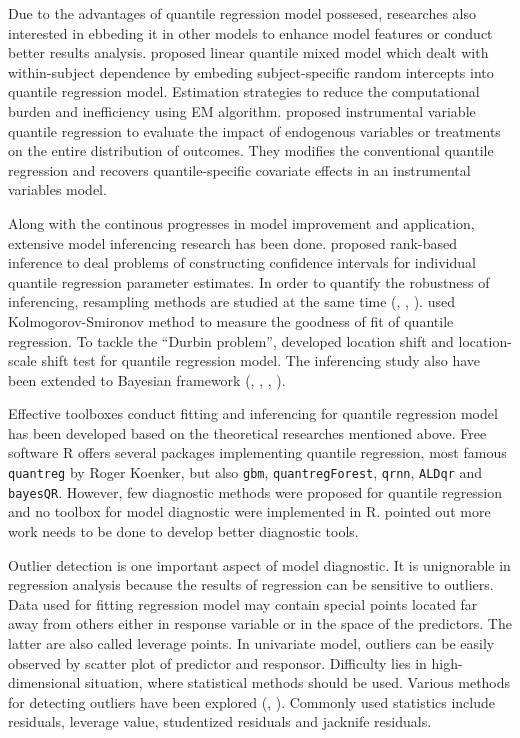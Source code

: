 \documentclass[11pt,a4paper,]{article}
\theoremstyle{definition}
\theoremstyle{definition}
\theoremstyle{remark}
\begin{document}
Due to the advantages of quantile regression model possesed, researches
also interested in ebbeding it in other models to enhance model features
or conduct better results analysis. \textcite{geraci2014linear} proposed
linear quantile mixed model which dealt with within-subject dependence
by embeding subject-specific random intercepts into quantile regression
model. Estimation strategies to reduce the computational burden and
inefficiency using EM algorithm. \textcite{chernozhukov2006instrumental}
proposed instrumental variable quantile regression to evaluate the
impact of endogenous variables or treatments on the entire distribution
of outcomes. They modifies the conventional quantile regression and
recovers quantile-specific covariate effects in an instrumental
variables model.

Along with the continous progresses in model improvement and
application, extensive model inferencing research has been done.
\textcite{gutenbrunner1993tests} proposed rank-based inference to deal
problems of constructing confidence intervals for individual quantile
regression parameter estimates. In order to quantify the robustness of
inferencing, resampling methods are studied at the same time
(\textcite{hahn1995bootstrapping}, \textcite{buchinsky1995estimating},
\textcite{feng2011wild}). \textcite{koenker1999goodness} used
Kolmogorov-Smironov method to measure the goodness of fit of quantile
regression. To tackle the ``Durbin problem'',
\textcite{koenker2002inference} developed location shift and
location-scale shift test for quantile regression model. The inferencing
study also have been extended to Bayesian framework
(\textcite{yu2001bayesian}, \textcite{yu2007bayesian},
\textcite{kozumi2011gibbs}, \textcite{santos2016bayesian}).

Effective toolboxes conduct fitting and inferencing for quantile
regression model has been developed based on the theoretical researches
mentioned above. Free software R offers several packages implementing
quantile regression, most famous \texttt{quantreg} by Roger Koenker, but
also \texttt{gbm}, \texttt{quantregForest}, \texttt{qrnn},
\texttt{ALDqr} and \texttt{bayesQR}. However, few diagnostic methods
were proposed for quantile regression and no toolbox for model
diagnostic were implemented in R. \textcite{gu2017unobserved} pointed
out more work needs to be done to develop better diagnostic tools.

Outlier detection is one important aspect of model diagnostic. It is
unignorable in regression analysis because the results of regression can
be sensitive to outliers. Data used for fitting regression model may
contain special points located far away from others either in response
variable or in the space of the predictors. The latter are also called
leverage points. In univariate model, outliers can be easily observed by
scatter plot of predictor and responsor. Difficulty lies in
high-dimensional situation, where statistical methods should be used.
Various methods for detecting outliers have been explored
(\textcite{rousseeuw1990unmasking}, \textcite{gather1997convergence}).
Commonly used statistics include residuals, leverage value, studentized
residuals and jacknife residuals.
\end{document}
